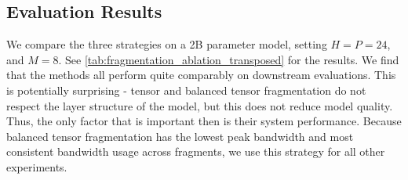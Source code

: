 \documentclass[11pt, a4paper, twocolumn, copyright, google]{google}
\begin{document}
\subsection{Evaluation Results}

We compare the three strategies on a 2B parameter model, setting $H = P = 24$, and $M = 8$. See \autoref{tab:fragmentation_ablation_transposed} for the results. We find that the methods all perform quite comparably on downstream evaluations. This is potentially surprising - tensor and balanced tensor fragmentation do not respect the layer structure of the model, but this does not reduce model quality. Thus, the only factor that is important then is their system performance. Because balanced tensor fragmentation has the lowest peak bandwidth and most consistent bandwidth usage across fragments, we use this strategy for all other experiments. 

\end{document}
